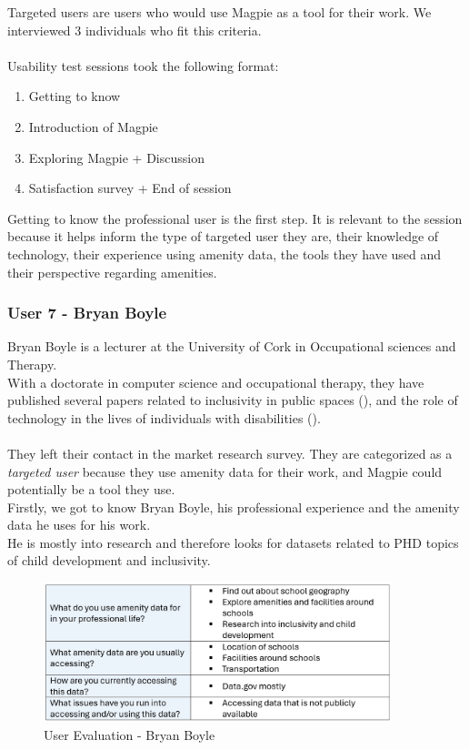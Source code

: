 Targeted users are users who would use Magpie as a tool for their work. We interviewed 3 individuals who fit this criteria.\\ \\
Usability test sessions took the following format:
\begin{enumerate}
    \item Getting to know
    \item Introduction of Magpie
    \item Exploring Magpie + Discussion
    \item Satisfaction survey + End of session
\end{enumerate}
Getting to know the professional user is the first step. It is relevant to the session because it helps inform the type of targeted user they are, their knowledge of technology, their experience using amenity data, the tools they have used and their perspective regarding amenities.

\subsubsection{User 7 - Bryan Boyle}
Bryan Boyle is a lecturer at the University of Cork in Occupational sciences and Therapy.\\ With a doctorate in computer science and occupational therapy, they have published several papers related to inclusivity in public spaces (\cite{bryanboyleplaygroundinclusion2023}), and the role of technology in the lives of individuals with disabilities (\cite{bryanboylechildrenautism2022}).\\ \\
They left their contact in the market research survey. They are categorized as a \emph{targeted user} because they use amenity data for their work, and Magpie could potentially be a tool they use.\\

\noindent Firstly, we got to know Bryan Boyle, his professional experience and the amenity data he uses for his work.\\
He is mostly into research and therefore looks for datasets related to PHD topics of child development and inclusivity.
\begin{figure}[h!]
    \centering
    \includegraphics[width=0.9\textwidth]{images/bryan-amenity-info.png}
    \caption{User Evaluation - Bryan Boyle}
\end{figure}\\

